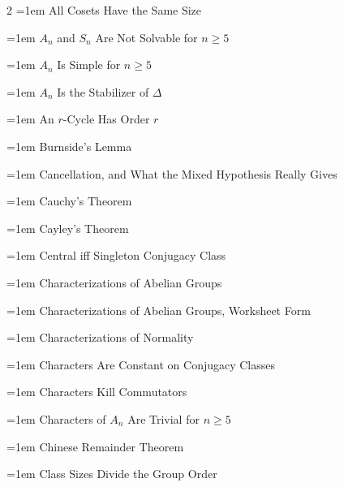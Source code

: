 \documentclass[11pt]{report}
\begin{document}
\begin{multicols}{2}
\noindent\hangindent=1em All Cosets Have the Same Size\dotfill \pageref{prop:all-cosets-have-same-size}\par
\noindent\hangindent=1em $A_n$ and $S_n$ Are Not Solvable for $n \geq 5$\dotfill \pageref{cor:an-sn-not-solvable}\par
\noindent\hangindent=1em $A_n$ Is Simple for $n \geq 5$\dotfill \pageref{thm:an-simple-n-ge-5}\par
\noindent\hangindent=1em $A_n$ Is the Stabilizer of $\Delta$\dotfill \pageref{cor:an-stabilizer-delta}\par
\noindent\hangindent=1em An $r$-Cycle Has Order $r$\dotfill \pageref{lem:r-cycle-has-order-r}\par
\noindent\hangindent=1em Burnside's Lemma\dotfill \pageref{thm:burnsides-lemma}\par
\noindent\hangindent=1em Cancellation, and What the Mixed Hypothesis Really Gives\dotfill \pageref{prop:cancellation-what-mixed-hypothesis-really-gives}\par
\noindent\hangindent=1em Cauchy's Theorem\dotfill \pageref{thm:cauchys-theorem}\par
\noindent\hangindent=1em Cayley's Theorem\dotfill \pageref{thm:cayleys-theorem}\par
\noindent\hangindent=1em Central iff Singleton Conjugacy Class\dotfill \pageref{prop:central-iff-singleton-conjugacy-class}\par
\noindent\hangindent=1em Characterizations of Abelian Groups\dotfill \pageref{prop:characterizations-abelian-groups}\par
\noindent\hangindent=1em Characterizations of Abelian Groups, Worksheet Form\dotfill \pageref{prop:characterizations-abelian-groups-worksheet-form}\par
\noindent\hangindent=1em Characterizations of Normality\dotfill \pageref{prop:characterizations-normality}\par
\noindent\hangindent=1em Characters Are Constant on Conjugacy Classes\dotfill \pageref{prop:characters-constant-conjugacy-classes}\par
\noindent\hangindent=1em Characters Kill Commutators\dotfill \pageref{prop:characters-kill-commutators}\par
\noindent\hangindent=1em Characters of $A_n$ Are Trivial for $n \geq 5$\dotfill \pageref{thm:characters-an-trivial}\par
\noindent\hangindent=1em Chinese Remainder Theorem\dotfill \pageref{thm:chinese-remainder-theorem}\par
\noindent\hangindent=1em Class Sizes Divide the Group Order\dotfill \pageref{cor:class-sizes-divide-group-order}\par

\end{multicols}
\end{document}
